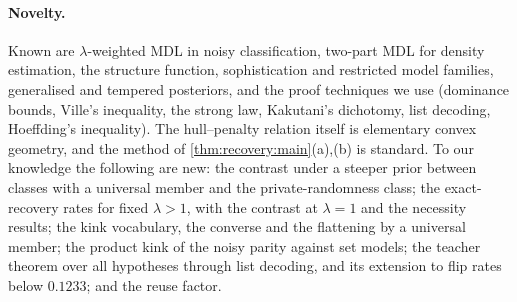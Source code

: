 \paragraph{Novelty.}\label{rem:related:new}
Known are $\lambda$-weighted MDL in noisy classification, two-part MDL for density estimation, the structure function, sophistication and restricted model families, generalised and tempered posteriors, and the proof techniques we use (dominance bounds, Ville's inequality, the strong law, Kakutani's dichotomy, list decoding, Hoeffding's inequality). The hull--penalty relation itself is elementary convex geometry, and the method of \cref{thm:recovery:main}(a),(b) is standard. To our knowledge the following are new: the contrast under a steeper prior between classes with a universal member and the private-randomness class; the exact-recovery rates for fixed $\lambda>1$, with the contrast at $\lambda=1$ and the necessity results; the kink vocabulary, the converse and the flattening by a universal member; the product kink of the noisy parity against set models; the teacher theorem over all hypotheses through list decoding, and its extension to flip rates below $0.1233$; and the reuse factor.
